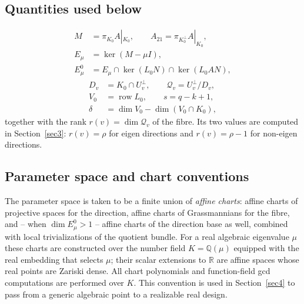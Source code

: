\documentclass[journal]{IEEEtran}
\theoremstyle{plainn}
\theoremstyle{remark}
\newcommand{\row}{\operatorname{row}}
\begin{document}
\subsection{Quantities used below}
\label{sec:prelim:quantities}

\begin{equation}
  \label{eq:compression}
  \begin{aligned}
    M&=\pi_{K_0}A|_{K_0},\qquad A_{21}=\pi_{K_0^\perp}A|_{K_0},\\
    E_\mu&=\ker(M-\mu I),\\
    E_\mu^0&=E_\mu\cap\ker(L_0N)\cap\ker(L_0AN),
  \end{aligned}
\end{equation}
\begin{equation}
  \label{eq:fibre-data}
  \begin{aligned}
    D_v&=K_0\cap U_v^\perp,\qquad \mathcal Q_v=U_v^\perp/D_v,\\
    V_0&=\row L_0,\qquad s=q-k+1,\\
    \delta&=\dim V_0-\dim(V_0\cap K_0),
  \end{aligned}
\end{equation}
together with the rank $r(v)=\dim\mathcal Q_v$ of the fibre. Its two values are computed in
Section~\ref{sec3}: $r(v)=\rho$ for eigen directions and $r(v)=\rho-1$ for non-eigen
directions.

\subsection{Parameter space and chart conventions}
\label{sec:prelim:charts}

The parameter space is taken to be a finite union of \emph{affine charts}: affine charts of projective
spaces for the direction, affine charts of Grassmannians for the fibre, and -- when
$\dim E_\mu^0>1$ -- affine charts of the direction base as well, combined with local trivializations of
the quotient bundle. For a real algebraic eigenvalue $\mu$ these charts are constructed over the number
field $K=\mathbb Q(\mu)$ equipped with the real embedding that selects $\mu$; their scalar extensions to
$\mathbb R$ are affine spaces whose real points are Zariski dense. All chart polynomials and
function-field gcd computations are performed over $K$. This convention is used in
Section~\ref{sec4} to pass from a generic algebraic point to a realizable real design.

\end{document}
